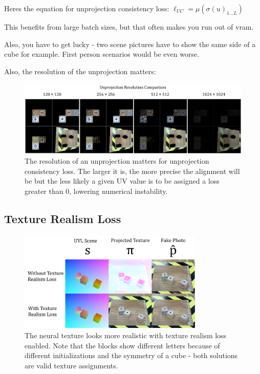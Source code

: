 \documentclass{article}
\begin{document}
Heres the equation for unprojection consistency loss:
$\ell_{UC} = \mu\left(\sigma\left(u\right)_{1 \dots L}\right)$

This benefits from large batch sizes, but that often makes you run out of vram.

Also, you have to get lucky - two scene pictures have to show the same side of a cube for example. First person scenarios would be even worse.

Also, the resolution of the unprojection matters:

\begin{figure}[H]
	\begin{center}
		\includegraphics[width=400pt]{../images/unprojection_resolution_comparison.pdf}
	\end{center}
	\caption{
		The resolution of an unprojection matters for unprojection consistency loss. The larger it is, the more precise the alignment will be but the less likely a given UV value is to be assigned a loss greater than 0, lowering numerical instability.
	}
	\label{fig:unprojection_resolution_comparison}
\end{figure}

\subsection{Texture Realism Loss}
\label{sec:texture_realism_loss}

\begin{figure}[H]
	\begin{center}
		\includegraphics[width=250pt]{../images/texture_realism_ablation.pdf}
	\end{center}
	\caption{
		The neural texture looks more realistic with texture realism loss enabled. Note that the blocks show different letters because of different initializations and the symmetry of a cube - both solutions are valid texture assignments. 
	}
	\label{fig:texture_realism_ablation}
\end{figure}
\end{document}
